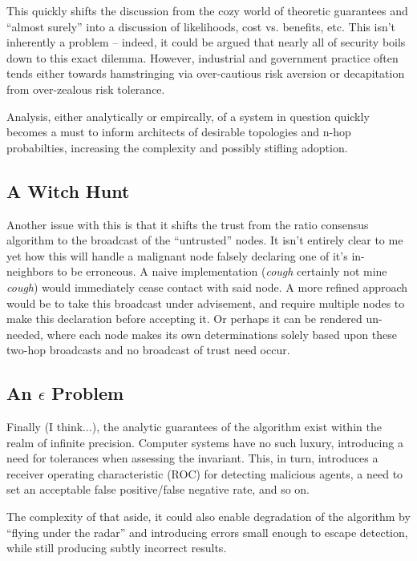 \documentclass[11pt]{article}
\begin{document}
This quickly shifts the discussion from the cozy world of theoretic guarantees
and ``almost surely'' into a discussion of likelihoods, cost vs. benefits, etc.
This isn't inherently a problem -- indeed, it could be argued that nearly all of
security boils down to this exact dilemma. However, industrial and government
practice often tends either towards hamstringing via over-cautious risk aversion or
decapitation from over-zealous risk tolerance.

Analysis, either analytically or empircally, of a system in question quickly
becomes a must to inform architects of desirable topologies and n-hop
probabilties, increasing the complexity and possibly stifling adoption.

\subsection*{A Witch Hunt}
Another issue with this is that it shifts the trust from the ratio consensus algorithm
to the broadcast of the ``untrusted'' nodes. It isn't entirely clear to me yet
how this will handle a malignant node falsely declaring one of it's in-neighbors to be
erroneous. A naive implementation (\textit{cough} certainly not mine \textit{cough})
would immediately cease contact with said node. A more refined approach
would be to take this broadcast under advisement, and require multiple
nodes to make this declaration before accepting it. Or perhaps it can be
rendered un-needed, where each node makes its own determinations
solely based upon these two-hop broadcasts and no broadcast of trust need occur.

\subsection*{An $\epsilon$ Problem}
Finally (I think...), the analytic guarantees of the algorithm exist within the
realm of infinite precision. Computer systems have no such luxury, introducing a
need for tolerances when assessing the invariant.  This, in turn, introduces a
receiver operating characteristic (ROC) for detecting malicious agents, a need to
set an acceptable false positive/false negative rate, and so on.

The complexity of that aside, it could also enable degradation of the algorithm
by ``flying under the radar'' and introducing errors small enough to escape
detection, while still producing subtly incorrect results.
\end{document}
